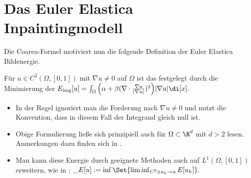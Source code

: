 \documentclass{mythesis}
\begin{document}
\section{Das Euler Elastica Inpaintingmodell}


Die Coarea-Formel motiviert nun die folgende Definition der Euler Elastica Bildenergie.

\begin{definition} \label{def:eemodel}
    Für $u \in C^2(\Omega, [0,1])$ mit $\nabla u \neq 0$ auf $\Omega$ ist das  festgelegt durch die Minimierung der 
    \begin{math}
	\Eimg[u] = \int_\Omega \Big(\alpha + \beta (\nabla \cdot \frac{\nabla u}{|\nabla u|})^2\Big)|\nabla u| \di[x].
    \end{math}
    \begin{note}
	\begin{itemize}
	    \item
		In der Regel ignoriert man die Forderung nach $\nabla u \neq 0$ und nutzt die Konvention, dass in diesem Fall der Integrand gleich null ist.
	    \item
		Obige Formulierung ließe sich prinzipiell auch für $\Omega \subset \R^d$ mit $d > 2$ lesen.
		Anmerkungen dazu finden sich in \cite{ambrosio2003direct}.
	    \item
		Man kann diese Energie durch geeignete Methoden auch auf $L^1(\Omega, [0,1])$ erweitern, wie in \cite{ambrosio2003direct}:
		\begin{math}
		    \_E[u] := \inf \Set{ \liminf_{C^2 \ni u_h \to u} E[u_h] }.
		\end{math}
	\end{itemize}
    \end{note}
\end{definition}
\end{document}
